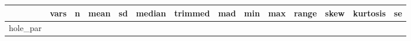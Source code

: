 \documentclass[
]{article}
\begin{document}
\begin{longtable}[]{@{}lrrrrrrrrrrrrr@{}}
\toprule
\begin{minipage}[b]{0.07\columnwidth}\raggedright
\strut
\end{minipage} & \begin{minipage}[b]{0.03\columnwidth}\raggedleft
vars\strut
\end{minipage} & \begin{minipage}[b]{0.04\columnwidth}\raggedleft
n\strut
\end{minipage} & \begin{minipage}[b]{0.05\columnwidth}\raggedleft
mean\strut
\end{minipage} & \begin{minipage}[b]{0.04\columnwidth}\raggedleft
sd\strut
\end{minipage} & \begin{minipage}[b]{0.04\columnwidth}\raggedleft
median\strut
\end{minipage} & \begin{minipage}[b]{0.05\columnwidth}\raggedleft
trimmed\strut
\end{minipage} & \begin{minipage}[b]{0.04\columnwidth}\raggedleft
mad\strut
\end{minipage} & \begin{minipage}[b]{0.04\columnwidth}\raggedleft
min\strut
\end{minipage} & \begin{minipage}[b]{0.04\columnwidth}\raggedleft
max\strut
\end{minipage} & \begin{minipage}[b]{0.04\columnwidth}\raggedleft
range\strut
\end{minipage} & \begin{minipage}[b]{0.04\columnwidth}\raggedleft
skew\strut
\end{minipage} & \begin{minipage}[b]{0.06\columnwidth}\raggedleft
kurtosis\strut
\end{minipage} & \begin{minipage}[b]{0.04\columnwidth}\raggedleft
se\strut
\end{minipage}\tabularnewline
\midrule
\endhead
\begin{minipage}[t]{0.07\columnwidth}\raggedright
hole\_par\strut
\end{minipage} & \begin{minipage}[t]{0.03\columnwidth}\raggedleft
1\strut
\end{minipage} & \begin{minipage}[t]{0.04\columnwidth}\raggedleft

\end{minipage}
\end{longtable}
\end{document}
